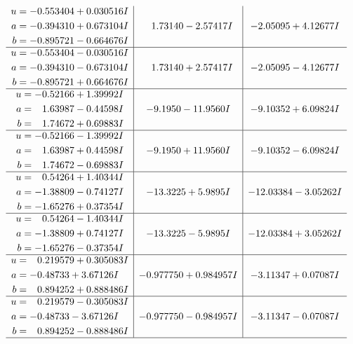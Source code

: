\documentclass[1p]{elsarticle_modified}
\theoremstyle{definition}
\begin{document}
$$\begin{array}{c|c|c}
\begin{aligned}
u &= -0.553404 + 0.030516 I \\
a &= -0.394310 + 0.673104 I \\
b &= -0.895721 - 0.664676 I\end{aligned}
 & \phantom{-}1.73140 - 2.57417 I & -2.05095 + 4.12677 I \\ \hline\begin{aligned}
u &= -0.553404 - 0.030516 I \\
a &= -0.394310 - 0.673104 I \\
b &= -0.895721 + 0.664676 I\end{aligned}
 & \phantom{-}1.73140 + 2.57417 I & -2.05095 - 4.12677 I \\ \hline\begin{aligned}
u &= -0.52166 + 1.39992 I \\
a &= \phantom{-}1.63987 - 0.44598 I \\
b &= \phantom{-}1.74672 + 0.69883 I\end{aligned}
 & -9.1950 - 11.9560 I & -9.10352 + 6.09824 I \\ \hline\begin{aligned}
u &= -0.52166 - 1.39992 I \\
a &= \phantom{-}1.63987 + 0.44598 I \\
b &= \phantom{-}1.74672 - 0.69883 I\end{aligned}
 & -9.1950 + 11.9560 I & -9.10352 - 6.09824 I \\ \hline\begin{aligned}
u &= \phantom{-}0.54264 + 1.40344 I \\
a &= -1.38809 - 0.74127 I \\
b &= -1.65276 + 0.37354 I\end{aligned}
 & -13.3225 + 5.9895 I & -12.03384 - 3.05262 I \\ \hline\begin{aligned}
u &= \phantom{-}0.54264 - 1.40344 I \\
a &= -1.38809 + 0.74127 I \\
b &= -1.65276 - 0.37354 I\end{aligned}
 & -13.3225 - 5.9895 I & -12.03384 + 3.05262 I \\ \hline\begin{aligned}
u &= \phantom{-}0.219579 + 0.305083 I \\
a &= -0.48733 + 3.67126 I \\
b &= \phantom{-}0.894252 + 0.888486 I\end{aligned}
 & -0.977750 + 0.984957 I & -3.11347 + 0.07087 I \\ \hline\begin{aligned}
u &= \phantom{-}0.219579 - 0.305083 I \\
a &= -0.48733 - 3.67126 I \\
b &= \phantom{-}0.894252 - 0.888486 I\end{aligned}
 & -0.977750 - 0.984957 I & -3.11347 - 0.07087 I\\
 \hline 
 \end{array}$$\newpage\newpage\renewcommand{\arraystretch}{1}
\end{document}
